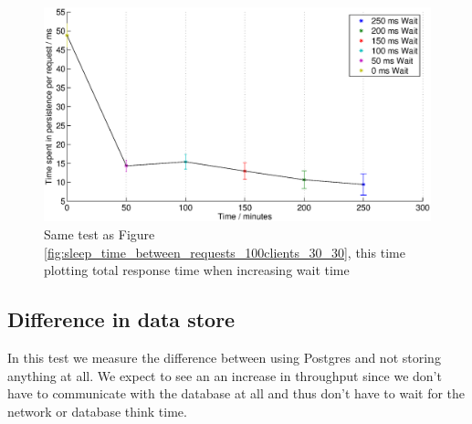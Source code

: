 \documentclass{article}
\begin{document}
              \begin{figure}[H]
                \begin{adjustwidth}{-2.5cm}{}
                      \centering
                      \includegraphics[scale=0.60]{sleep_time_between_requests_respTime_100clients_30_30}
                      \caption{Same test as Figure \ref{fig:sleep_time_between_requests_100clients_30_30}, this time plotting total response time when increasing wait time}
                      \label{fig:sleep_time_between_requests_respTime_100clients_30_30}
                \end{adjustwidth}
              \end{figure}


        \subsection{Difference in data store}
            In this test we measure the difference between using Postgres and not storing anything at all. We expect to see an an increase in throughput since we don't have to communicate with the database at all and thus don't have to wait for the network or database think time.
            
\end{document}
